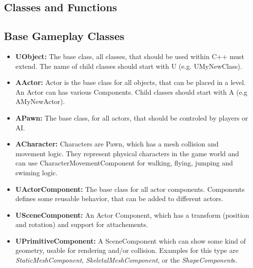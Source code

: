 \documentclass[10pt,a4paper]{article}
\begin{document}
	\pagebreak
	
\begin{multicols*}{2}
	\section{Classes and Functions}

	\subsection{Base Gameplay Classes}
	
	\begin{itemize}
		\item \textbf{UObject:} The base class, all classes, that should be used within C++ must extend. The name of child classes should start with U (e.g. UMyNewClass).
		\item \textbf{AActor:} Actor is the base class for all objects, that can be placed in a level. An Actor can has various Components. Child classes should start with A (e.g AMyNewActor).
		\item \textbf{APawn:} The base class, for all actors, that should be controled by players or AI.
		\item \textbf{ACharacter:} Characters are Pawn, which has a mesh collision and movement logic. They represent physical characters in the game world and can use CharacterMovementComponent for walking, flying, jumping and swiming logic.
		\item \textbf{UActorComponent:} The base class for all actor components. Components defines some reusable behavior, that can be added to different actors.
		\item \textbf{USceneComponent:} An Actor Component, which has a transform (position and rotation) and support for attachements.
		\item \textbf{UPrimitiveComponent:} A SceneComponent which can show some kind of geometry, usable for rendering and/or collision. Examples for this type are \emph{StaticMeshComponent}, \emph{SkeletalMeshComponent}, or the \emph{ShapeComponent}s.
		
	\end{itemize}
	

\end{multicols*}
\end{document}
